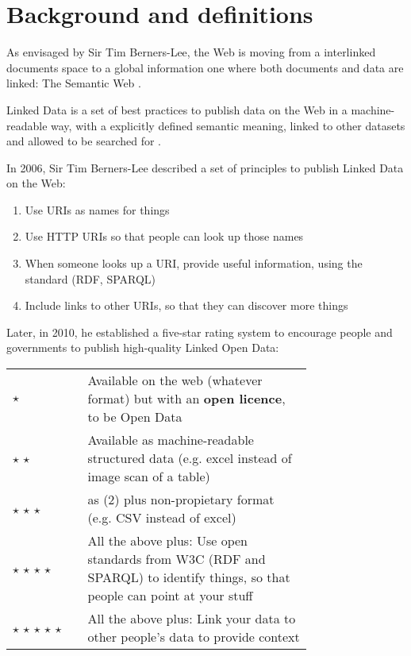 \section{Background and definitions}
\label{subsec:background}

As envisaged by Sir Tim Berners-Lee, the Web is moving from a interlinked documents space to a global information one where both documents and data are linked: The Semantic Web \cite{berners2001semantic}.

Linked Data is a set of best practices to publish data on the Web in a machine-readable way, with a explicitly defined semantic meaning, linked to other datasets and allowed to be searched for \cite{bizer2009linked}.

In 2006, Sir Tim Berners-Lee described a set of principles to publish Linked Data on the Web:

\begin{enumerate}
  \item Use URIs as names for things
  \item Use HTTP URIs so that people can look up those names
  \item When someone looks up a URI, provide useful information, using the standard (RDF, SPARQL)
  \item Include links to other URIs, so that they can discover more things \\[\baselineskip]
\end{enumerate} 

Later, in 2010, he established a five-star rating system to encourage people and governments to publish high-quality Linked Open Data: 

\begin{tabular}{ l p{0.75\linewidth} }
  $\star$ & Available on the web (whatever format) but with an \textbf{open licence}, to be Open Data \\
  $\star$ $\star$ & Available as machine-readable structured data (e.g. excel instead of image scan of a table) \\
  $\star$ $\star$ $\star$ & as (2) plus non-propietary format (e.g. CSV instead of excel) \\
  $\star$ $\star$ $\star$ $\star$ & All the above plus: Use open standards from W3C (RDF and SPARQL) to identify things, so that people can point at your stuff \\
  $\star$ $\star$ $\star$ $\star$ $\star$ & All the above plus: Link your data to other people's data to provide context \\[\baselineskip]
\end{tabular}

